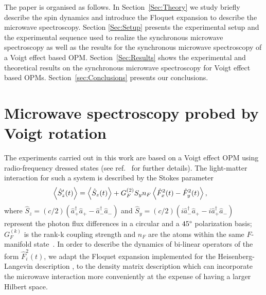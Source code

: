 \documentclass[%
reprint,
 amsmath,amssymb,
 aps,
floatfix,
]{revtex4-1}
\begin{document}
The paper is organised as follows. In Section~\ref{Sec:Theory} we study briefly describe the spin dynamics and introduce the Floquet expansion to describe the microwave spectroscopy. Section \ref{Sec:Setup} presents the experimental setup and the experimental sequence used to realize the synchronous microwave spectroscopy as well as the results for the synchronous microwave spectroscopy of a Voigt effect based OPM. Section~\ref{Sec:Results} shows the experimental and theoretical results on the synchronous microwave spectroscopy for Voigt effect based OPMs. Section~\ref{sec:Conclusions} presents our conclusions.
\section{Microwave spectroscopy probed by Voigt rotation \label{Sec:Theory}}

The experiments carried out in this work are based on a Voigt effect OPM using radio-frequency dressed states (see ref.~\cite{Tadas19} for further details). The light-matter interaction for such a system is  described by the Stokes parameter
\begin{align}
\Braket{\hat{S}_z'(t)}&=\Braket{\hat{S}_z(t)}+
G_{F}^{(2)} S_y n_F \Braket{\hat{F}_x^2(t)-\hat{F}_y^2(t)}\label{eq:Voigt},
\end{align}
where $\hat{S}_z=(c/2)(\hat{a}^{\dagger}_{+}\hat{a}_{+}-\hat{a}^{\dagger}_{-}\hat{a}_{-})$ and $\hat{S}_y=(c/2)(i\hat{a}^{\dagger}_{-}\hat{a}_{+}-i\hat{a}^{\dagger}_{+}\hat{a}_{-})$ represent the photon flux differences in a circular and a $45\degree$ polarization basis;  $G_{F}^{(k)}$ is the rank-k coupling strength and $n_F$ are the atoms within the same $F$-manifold state~\cite{Jammi18}. 
In order to describe the dynamics of bi-linear operators of the form $\hat{F}_i^2(t)$, we adapt the Floquet expansion implemented for the Heisenberg-Langevin description \cite{Floquet21}, to the density matrix description which can incorporate the microwave interaction more conveniently at the expense of having a larger Hilbert space. 
\end{document}
